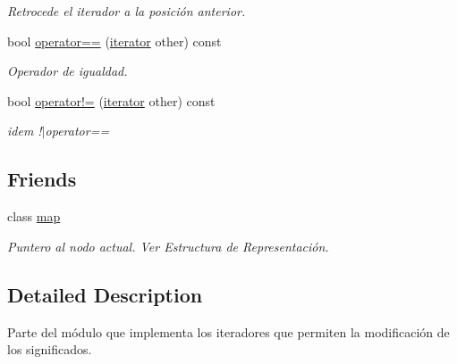 \begin{DoxyCompactItemize}
\begin{DoxyCompactList}\small\item\em \-Retrocede el iterador a la posición anterior. \end{DoxyCompactList}\item 
bool \hyperlink{classaed2_1_1iterator_1_1iterator_a479ef64daa1f0e82b05fa1f80d57f479}{operator==} (\hyperlink{classaed2_1_1iterator_1_1iterator}{iterator} other) const 
\begin{DoxyCompactList}\small\item\em \-Operador de igualdad. \end{DoxyCompactList}\item 
\hypertarget{classaed2_1_1iterator_1_1iterator_a8facdf09114b97042cf3d6403ba1d719}{bool \hyperlink{classaed2_1_1iterator_1_1iterator_a8facdf09114b97042cf3d6403ba1d719}{operator!=} (\hyperlink{classaed2_1_1iterator_1_1iterator}{iterator} other) const }\label{classaed2_1_1iterator_1_1iterator_a8facdf09114b97042cf3d6403ba1d719}

\begin{DoxyCompactList}\small\item\em idem !$|$operator== \end{DoxyCompactList}\end{DoxyCompactItemize}
\subsection*{\-Friends}
\begin{DoxyCompactItemize}
\item 
\hypertarget{classaed2_1_1iterator_1_1iterator_aeda338414e516b47761f994fb78056c6}{class \hyperlink{classaed2_1_1iterator_1_1iterator_aeda338414e516b47761f994fb78056c6}{map}}\label{classaed2_1_1iterator_1_1iterator_aeda338414e516b47761f994fb78056c6}

\begin{DoxyCompactList}\small\item\em \-Puntero al nodo actual. \-Ver \-Estructura de \-Representación. \end{DoxyCompactList}\end{DoxyCompactItemize}


\subsection{\-Detailed \-Description}
\-Parte del módulo que implementa los iteradores que permiten la modificación de los significados. 

